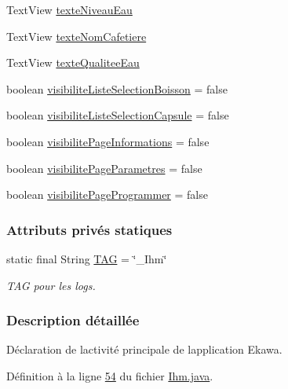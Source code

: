 \begin{DoxyCompactItemize}
\item 
Text\+View \hyperlink{classcom_1_1example_1_1ekawa_1_1_ihm_aa20f5ea009dec0e50b6df5aaffbb690c}{texte\+Niveau\+Eau}
\item 
Text\+View \hyperlink{classcom_1_1example_1_1ekawa_1_1_ihm_abc84321aabf4b59d9e452afdb878357f}{texte\+Nom\+Cafetiere}
\item 
Text\+View \hyperlink{classcom_1_1example_1_1ekawa_1_1_ihm_af66cb31129c00413279e8254a6599143}{texte\+Qualitee\+Eau}
\item 
boolean \hyperlink{classcom_1_1example_1_1ekawa_1_1_ihm_a874a157d2a92d1a386a06512f36182ff}{visibilite\+Liste\+Selection\+Boisson} = false
\item 
boolean \hyperlink{classcom_1_1example_1_1ekawa_1_1_ihm_aa6b9cda83ef1aba8816fd43797fb7ab2}{visibilite\+Liste\+Selection\+Capsule} = false
\item 
boolean \hyperlink{classcom_1_1example_1_1ekawa_1_1_ihm_a3a1aee8b3e12447c5a73aa16de64b1f0}{visibilite\+Page\+Informations} = false
\item 
boolean \hyperlink{classcom_1_1example_1_1ekawa_1_1_ihm_abc6f7d562f994f120a9034a9e11b72d0}{visibilite\+Page\+Parametres} = false
\item 
boolean \hyperlink{classcom_1_1example_1_1ekawa_1_1_ihm_a1db719bfa9b48f6c1f64259e37703963}{visibilite\+Page\+Programmer} = false
\end{DoxyCompactItemize}
\subsubsection*{Attributs privés statiques}
\begin{DoxyCompactItemize}
\item 
static final String \hyperlink{classcom_1_1example_1_1ekawa_1_1_ihm_a95cd92c2acaf9f8982302da08d94f9aa}{T\+AG} = \char`\"{}\+\_\+\+Ihm\char`\"{}
\begin{DoxyCompactList}\small\item\em T\+AG pour les logs. \end{DoxyCompactList}\end{DoxyCompactItemize}


\subsubsection{Description détaillée}
Déclaration de l\textquotesingle{}activité principale de l\textquotesingle{}application Ekawa. 

Définition à la ligne \hyperlink{_ihm_8java_source_l00054}{54} du fichier \hyperlink{_ihm_8java_source}{Ihm.\+java}.



